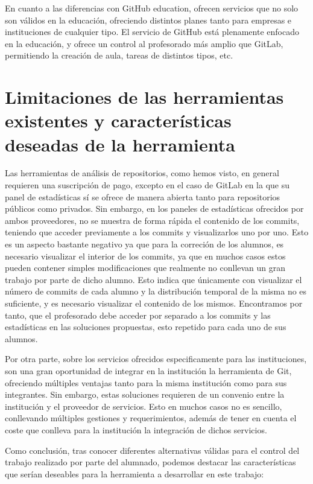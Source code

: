 En cuanto a las diferencias con GitHub education, ofrecen servicios que no
solo son válidos en la educación, ofreciendo distintos planes tanto para
empresas e instituciones de cualquier tipo. El servicio de GitHub está
plenamente enfocado en la educación, y ofrece un control al profesorado más
amplio que GitLab, permitiendo la creación de aula, tareas de distintos
tipos, etc.


\section{Limitaciones de las herramientas existentes y características
  deseadas de la herramienta}

Las herramientas de análisis de repositorios, como hemos visto, en general
requieren una suscripción de pago, excepto en el caso de GitLab en la que
su panel de estadísticas sí se ofrece de manera abierta tanto para
repositorios públicos como privados. Sin embargo, en los paneles de
estadísticas ofrecidos por ambos proveedores, no se muestra de forma rápida
el contenido de los commits, teniendo que acceder previamente a los commits
y visualizarlos uno por uno. Esto es un aspecto bastante negativo ya que
para la correción de los alumnos, es necesario visualizar el interior de
los commits, ya que en muchos casos estos pueden contener simples
modificaciones que realmente no conllevan un gran trabajo por parte de
dicho alumno. Esto indica que únicamente con visualizar el número de
commits de cada alumno y la distribución temporal de la misma no es
suficiente, y es necesario visualizar el contenido de los mismos.
Encontramos por tanto, que el profesorado debe acceder por separado a los
commits y las estadísticas en las soluciones propuestas, esto repetido para
cada uno de sus alumnos.

Por otra parte, sobre los servicios ofrecidos especificamente para las
instituciones, son una gran oportunidad de integrar en la institución la
herramienta de Git, ofreciendo múltiples ventajas tanto para la misma
institución como para sus integrantes. Sin embargo, estas soluciones
requieren de un convenio entre la institución y el proveedor de servicios.
Esto en muchos casos no es sencillo, conllevando múltiples gestiones y
requerimientos, además de tener en cuenta el coste que conlleva
para la institución la integración de dichos servicios.

Como conclusión, tras conocer diferentes alternativas válidas para el
control del trabajo realizado por parte del alumnado, podemos destacar las
características que serían deseables para la herramienta a desarrollar en
este trabajo:

